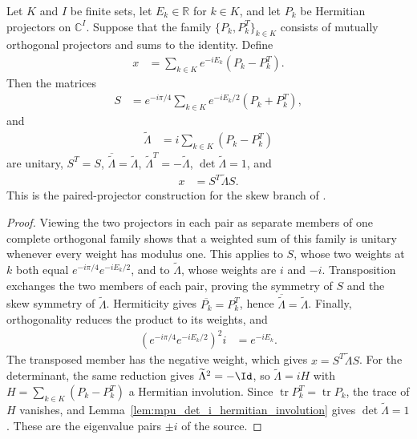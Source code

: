 \begin{lemma}
    \label{lem:mpu_skew_unitary_paired_projectors}
    \leanok
    Let $K$ and $I$ be finite sets, let $E_k\in\mathbb R$ for $k\in K$, and
    let $P_k$ be Hermitian projectors on $\mathbb C^I$. Suppose that the family
    $\{P_k,P_k^T\}_{k\in K}$ consists of mutually orthogonal projectors and
    sums to the identity. Define
    \begin{align}
        x & = \sum_{k\in K} e^{-iE_k}(P_k-P_k^T).
    \end{align}
    Then the matrices
    \begin{align}
        S & = e^{-i\pi/4}\sum_{k\in K} e^{-iE_k/2}(P_k+P_k^T),
    \end{align}
    and
    \begin{align}
        \widetilde\Lambda & = i\sum_{k\in K}(P_k-P_k^T)
    \end{align}
    are unitary, $S^T=S$, $\overline{\widetilde\Lambda}=\widetilde\Lambda$,
    $\widetilde\Lambda^T=-\widetilde\Lambda$, $\det\widetilde\Lambda=1$, and
    \begin{align}
        x & = S^T\widetilde\Lambda S.
    \end{align}
    This is the paired-projector construction for the skew branch of
    \cite[Lemma~\texttt{lemma:conjclass-normalform-continuous}]{Cirac2017MPU}.
\end{lemma}

\begin{proof}\leanok
    Viewing the two projectors in each pair as separate members of one
    complete orthogonal family shows that a weighted sum of this family is
    unitary whenever every weight has modulus one. This applies to $S$, whose
    two weights at $k$ both equal $e^{-i\pi/4}e^{-iE_k/2}$, and to
    $\widetilde\Lambda$, whose weights are $i$ and $-i$.
    Transposition exchanges the two members of each pair, proving the symmetry
    of $S$ and the skew symmetry of $\widetilde\Lambda$. Hermiticity gives
    $\overline{P_k}=P_k^T$, hence
    $\overline{\widetilde\Lambda}=\widetilde\Lambda$. Finally, orthogonality
    reduces the product to its weights, and
    \begin{align}
        \left(e^{-i\pi/4}e^{-iE_k/2}\right)^2 i & = e^{-iE_k}.
    \end{align}
    The transposed member has the negative weight, which gives
    $x=S^T\widetilde\Lambda S$. For the determinant, the same reduction gives
    $\widetilde\Lambda^2=-\Id$, so $\widetilde\Lambda=iH$ with
    $H=\sum_{k\in K}(P_k-P_k^T)$ a Hermitian involution. Since
    $\operatorname{tr}P_k^T=\operatorname{tr}P_k$, the trace of $H$ vanishes,
    and Lemma~\ref{lem:mpu_det_i_hermitian_involution} gives
    $\det\widetilde\Lambda=1$. These are the eigenvalue pairs $\pm i$ of the
    source.
\end{proof}


